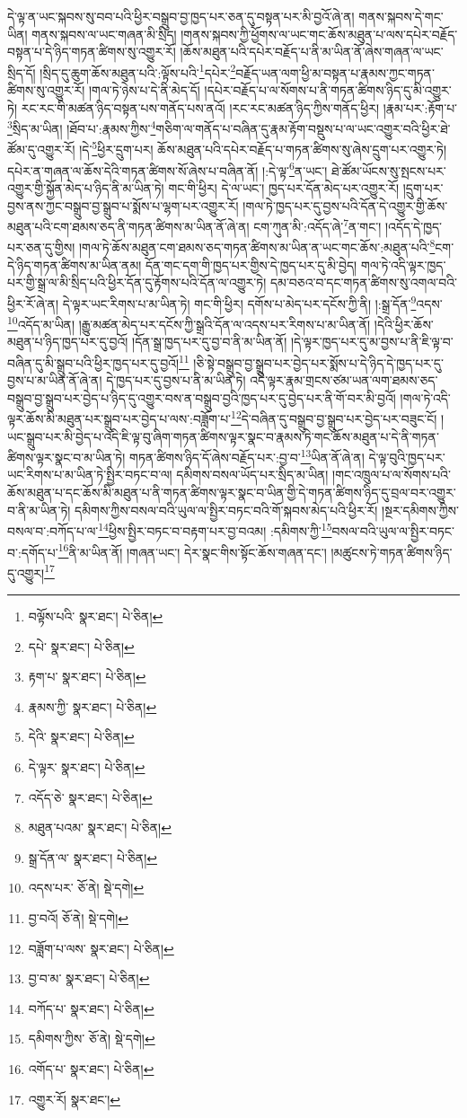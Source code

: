དེ་ལྟ་ན་ཡང་སྐབས་སུ་བབ་པའི་ཕྱིར་བསྒྲུབ་བྱ་ཁྱད་པར་ཅན་དུ་བསྟན་པར་མི་བྱའོ་ཞེ་ན། གནས་སྐབས་དེ་གང་ཡིན། གནས་སྐབས་ལ་ཡང་གཞན་མི་སྲིད། །གནས་སྐབས་ཀྱི་ཕྱོགས་ལ་ཡང་གང་ཆོས་མཐུན་པ་ལས་དཔེར་བརྗོད་བསྟན་པ་དེ་ཉིད་གཏན་ཚིགས་སུ་འགྱུར་རོ། །ཆོས་མཐུན་པའི་དཔེར་བརྗོད་པ་ནི་མ་ཡིན་ནོ་ཞེས་གཞན་ལ་ཡང་སྲིད་དོ། །སྲིད་དུ་ཆུག་ཆོས་མཐུན་པའི་:ལྟོས་པའི་\footnote{བལྟོས་པའི་  སྣར་ཐང་།  པེ་ཅིན། }དཔེར་\footnote{དཔེ་  སྣར་ཐང་།  པེ་ཅིན། }བརྗོད་ཡན་ལག་ཕྱི་མ་བསྟན་པ་རྣམས་ཀྱང་གཏན་ཚིགས་སུ་འགྱུར་རོ། །གལ་ཏེ་ཉེས་པ་དེ་ནི་མེད་དོ། །དཔེར་བརྗོད་པ་ལ་སོགས་པ་ནི་གཏན་ཚིགས་ཉིད་དུ་མི་འགྱུར་ཏེ། རང་རང་གི་མཚན་ཉིད་བསྟན་པས་གནོད་པས་ནའོ། །རང་རང་མཚན་ཉིད་ཀྱིས་གནོད་ཕྱིར། །རྣམ་པར་:རྟོག་པ་\footnote{རྟག་པ་  སྣར་ཐང་།  པེ་ཅིན། }སྲིད་མ་ཡིན། །ཐོབ་པ་:རྣམས་ཀྱིས་\footnote{རྣམས་ཀྱི་  སྣར་ཐང་།  པེ་ཅིན། }གཅིག་ལ་གནོད་པ་བཞིན་དུ་རྣམ་རྟོག་བསྡུས་པ་ལ་ཡང་འགྱུར་བའི་ཕྱིར་ཐེ་ཚོམ་དུ་འགྱུར་རོ། །དེ་\footnote{དེའི་  སྣར་ཐང་།  པེ་ཅིན། }ཕྱིར་དྲུག་པར། ཆོས་མཐུན་པའི་དཔེར་བརྗོད་པ་གཏན་ཚིགས་སུ་ཞེས་དྲུག་པར་འགྱུར་ཏེ། དཔེར་ན་གཞན་ལ་ཆོས་དེའི་གཏན་ཚིགས་སོ་ཞེས་པ་བཞིན་ནོ། །:དེ་ལྟ་\footnote{དེ་ལྟར་  སྣར་ཐང་།  པེ་ཅིན། }ན་ཡང་། ཐེ་ཚོམ་ཡོངས་སུ་སྤངས་པར་འགྱུར་གྱི་སྐྱོན་མེད་པ་ཉིད་ནི་མ་ཡིན་ཏེ། གང་གི་ཕྱིར། དེ་ལ་ཡང་། ཁྱད་པར་དོན་མེད་པར་འགྱུར་རོ། །དྲུག་པར་བྱས་ནས་ཀྱང་བསྒྲུབ་བྱ་སྒྲུབ་པ་སྨོས་པ་ལྷག་པར་འགྱུར་རོ། །གལ་ཏེ་ཁྱད་པར་དུ་བྱས་པའི་དོན་དེ་འགྱུར་གྱི་ཆོས་མཐུན་པའི་ངག་ཐམས་ཅད་ནི་གཏན་ཚིགས་མ་ཡིན་ནོ་ཞེ་ན། ངག་ཀུན་མི་:འདོད་ཞེ་\footnote{འདོད་ཅེ་  སྣར་ཐང་།  པེ་ཅིན། }ན་གང་། །འདོད་དེ་ཁྱད་པར་ཅན་དུ་གྱིས། །གལ་ཏེ་ཆོས་མཐུན་ངག་ཐམས་ཅད་གཏན་ཚིགས་མ་ཡིན་ན་ཡང་གང་ཆོས་:མཐུན་པའི་\footnote{མཐུན་པའམ་  སྣར་ཐང་།  པེ་ཅིན། }ངག་དེ་ཉིད་གཏན་ཚིགས་མ་ཡིན་ནམ། དོན་གང་དག་གི་ཁྱད་པར་གྱིས་དེ་ཁྱད་པར་དུ་མི་བྱེད། གལ་ཏེ་འདི་ལྟར་ཁྱད་པར་གྱི་སྒྲ་ལ་མི་སྲིད་པའི་ཕྱིར་དོན་དུ་རྟོགས་པའི་དོན་ལ་འགྱུར་ཏེ། དམ་བཅའ་བ་དང་གཏན་ཚིགས་སུ་འགལ་བའི་ཕྱིར་རོ་ཞེ་ན། དེ་ལྟར་ཡང་རིགས་པ་མ་ཡིན་ཏེ། གང་གི་ཕྱིར། དགོས་པ་མེད་པར་དངོས་ཀྱི་ནི། །:སྒྲ་དོན་\footnote{སྒྲ་དོན་ལ་  སྣར་ཐང་།  པེ་ཅིན། }འདས་\footnote{འདས་པར་  ཅོ་ནེ།  སྡེ་དགེ། }འདོད་མ་ཡིན། །རྒྱུ་མཚན་མེད་པར་དངོས་ཀྱི་སྒྲའི་དོན་ལ་འདས་པར་རིགས་པ་མ་ཡིན་ནོ། །དེའི་ཕྱིར་ཆོས་མཐུན་པ་ཉིད་ཁྱད་པར་དུ་བྱའོ། །དོན་སྒྲ་ཁྱད་པར་དུ་བྱ་བ་ནི་མ་ཡིན་ནོ། །དེ་ལྟར་ཁྱད་པར་དུ་མ་བྱས་པ་ནི་ཇི་ལྟ་བ་བཞིན་དུ་མི་སྒྲུབ་པའི་ཕྱིར་ཁྱད་པར་དུ་བྱའོ།\footnote{བྱ་བའོ།  ཅོ་ནེ།  སྡེ་དགེ། } །ཅི་སྟེ་བསྒྲུབ་བྱ་སྒྲུབ་པར་བྱེད་པར་སྨོས་པ་དེ་ཉིད་དེ་ཁྱད་པར་དུ་བྱས་པ་མ་ཡིན་ནོ་ཞེ་ན། དེ་ཁྱད་པར་དུ་བྱས་པ་ནི་མ་ཡིན་ཏེ། འདི་ལྟར་རྣམ་གྲངས་ཙམ་ཡན་ལག་ཐམས་ཅད་བསྒྲུབ་བྱ་སྒྲུབ་པར་བྱེད་པ་ཉིད་དུ་འགྱུར་བས་ན་བསྒྲུབ་བྱའི་ཁྱད་པར་དུ་བྱེད་པར་ནི་གོ་བར་མི་བྱའོ། །གལ་ཏེ་འདི་ལྟར་ཆོས་མི་མཐུན་པར་སྒྲུབ་པར་བྱེད་པ་ལས་:བཟློག་པ་\footnote{བཟློག་པ་ལས་  སྣར་ཐང་།  པེ་ཅིན། }དེ་བཞིན་དུ་བསྒྲུབ་བྱ་སྒྲུབ་པར་བྱེད་པར་བཟུང་ངོ། །ཡང་སྒྲུབ་པར་མི་བྱེད་པ་འདི་ཇི་ལྟ་བུ་ཞིག་གཏན་ཚིགས་ལྟར་སྣང་བ་རྣམས་ཏེ་གང་ཆོས་མཐུན་པ་དེ་ནི་གཏན་ཚིགས་ལྟར་སྣང་བ་མ་ཡིན་ཏེ། གཏན་ཚིགས་ཉིད་དོ་ཞེས་བརྗོད་པར་:བྱ་བ་\footnote{བྱ་བ་མ་  སྣར་ཐང་།  པེ་ཅིན། }ཡིན་ནོ་ཞེ་ན། དེ་ལྟ་བུའི་ཁྱད་པར་ཡང་རིགས་པ་མ་ཡིན་ཏེ་སྤྱིར་བཏང་བ་ལ། དམིགས་བསལ་ཡོད་པར་སྲིད་མ་ཡིན། །གང་འཁྲུལ་པ་ལ་སོགས་པའི་ཆོས་མཐུན་པ་དང་ཆོས་མི་མཐུན་པ་ནི་གཏན་ཚིགས་ལྟར་སྣང་བ་ཡིན་གྱི་དེ་གཏན་ཚིགས་ཉིད་དུ་བྲལ་བར་འགྱུར་བ་ནི་མ་ཡིན་ཏེ། དམིགས་ཀྱིས་བསལ་བའི་ཡུལ་ལ་སྤྱིར་བཏང་བའི་གོ་སྐབས་མེད་པའི་ཕྱིར་རོ། །སྔར་དམིགས་ཀྱིས་བསལ་བ་:བཀོད་པ་ལ་\footnote{བཀོད་པ་  སྣར་ཐང་།  པེ་ཅིན། }ཕྱིས་སྤྱིར་བཏང་བ་བརྟག་པར་བྱ་བའམ། :དམིགས་ཀྱི་\footnote{དམིགས་ཀྱིས་  ཅོ་ནེ།  སྡེ་དགེ། }བསལ་བའི་ཡུལ་ལ་སྤྱིར་བཏང་བ་:དགོད་པ་\footnote{འགོད་པ་  སྣར་ཐང་།  པེ་ཅིན། }ནི་མ་ཡིན་ནོ། །གཞན་ཡང་། དེར་སྣང་གིས་སྟོང་ཆོས་གཞན་དང་། །མཚུངས་ཏེ་གཏན་ཚིགས་ཉིད་དུ་འགྱུར།\footnote{འགྱུར་རོ།  སྣར་ཐང་། } 